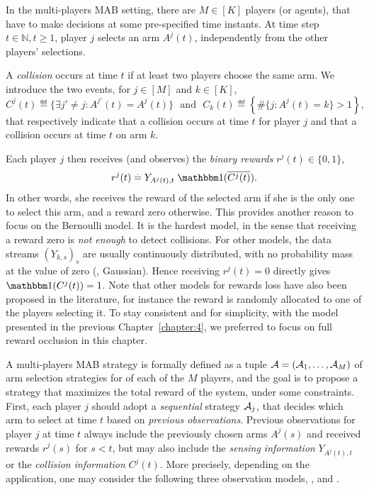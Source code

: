 In the multi-players MAB setting, there are $M \in [K]$ players (or agents),
that have to make decisions at some pre-specified time instants.
At time step $t \in\mathbb{N},t\geq1$, player $j$ selects an arm $A^j(t)$, independently from the other players' selections.

\begin{definition}
\begin{leftbar}[defnbar]  %
  A \emph{collision} occurs at time $t$ if at least two players choose the same arm.
  We introduce the two events, for $j\in[M]$ and $k\in[K]$,
  \begin{equation}
    C^j(t) \eqdef  \{ \exists j' \neq j : A^{j'}(t) = A^j(t) \}
    \ \ \ \text{and} \ \ \ C_k(t) \eqdef  \left\{ \# \{ j : A^j(t) = k\} > 1 \right\},
  \end{equation}
  that respectively indicate that a collision occurs at time $t$ for player $j$ and that a collision occurs at time $t$ on arm $k$.
\end{leftbar}  %
\end{definition}

Each player $j$ then receives (and observes) the \emph{binary rewards}
$r^j(t) \in \{0,1\}$,
\begin{equation}
  r^j(t) \eqdef Y_{A^j(t),t} \; \indic(\overline{C^j(t)}).
\end{equation}
In other words, she receives the reward of the selected arm if she is the only one to select this arm, and a reward zero otherwise.
This provides another reason to focus on the Bernoulli model. It is the hardest model, in the sense that receiving a reward zero is \emph{not enough} to detect collisions. For other models, the data streams $(Y_{k,s})_s$ are usually continuously distributed, with no probability mass at the value of zero (\eg, Gaussian).
Hence receiving $r^j(t) = 0$ directly gives $\indic(C^j(t)) = 1$.
%
Note that other models for rewards loss have also been proposed in the literature, for instance the reward is randomly allocated to one of the players selecting it.
To stay consistent and for simplicity, with the model presented in the previous Chapter~\ref{chapter:4},
we preferred to focus on full reward occlusion in this chapter.


A multi-players MAB strategy is formally defined as a tuple $\mathcal{A} = (\mathcal{A}_1,\dots,\mathcal{A}_M)$ of arm selection strategies for of each of the $M$ players, and the goal is to propose a strategy that maximizes the total reward of the system, under some constraints.
First, each player $j$ should adopt a \emph{sequential} strategy $\mathcal{A}_j$, that decides which arm to select at time $t$ based on \emph{previous observations}.
Previous observations for player $j$ at time $t$ always include the previously chosen arms $A^j(s)$ and received rewards $r^j(s)$ for $s<t$, but may also include the \emph{sensing information} $Y_{A^j(t),t}$ or the \emph{collision information} $C^j(t)$.
More precisely, depending on the application, one may consider the following three observation models, \modelun, \modeldeux{} and \modeltrois.

